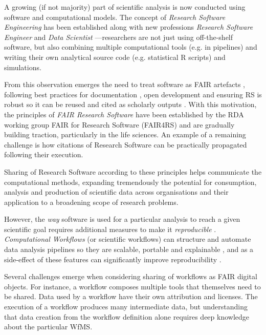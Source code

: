 A growing (if not majority) part of scientific analysis is now conducted using software and computational models.
The concept of \emph{Research Software Engineering} \cite{Cohen 2020} has been established along with new professions \emph{Research Software Engineer} \cite{Baxter 2012} and \emph{Data Scientist} \cite{van der Aalst 2014}---researchers are not just using off-the-shelf software, but also combining multiple computational tools (e.g. in pipelines) and writing their own analytical source code (e.g. statistical R scripts) and simulations.

From this observation emerges the need to treat software as FAIR artefacts \cite{Lamprecht 2019}, following best practices for documentation \cite{Lee 2018}, open development \cite{Prlić 2012} and ensuring \acrfull{RS} is robust \cite{Taschuk 2017} so it can be reused and cited as scholarly outputs \cite{Smith 2016}. 
With this motivation, the principles of \emph{FAIR Research Software} \cite{Katz 2021b} have been established by the \acrfull{RDA} working group FAIR for Research Software (FAIR4RS)  \cite{Barker 2022} and are gradually building traction, particularly in the life sciences.
An example of a remaining challenge is how citations of Research Software can be practically propagated following their execution. 

Sharing of Research Software according to these principles helps communicate the computational methods, expanding tremendously the potential for consumption, analysis and production of scientific data across organisations and their application to a broadening scope of research problems.

However, the \emph{way} software is used for a particular analysis to reach a given scientific goal requires additional measures to make it \emph{reproducible} \cite{Stodden 2016,Sandve 2013}. \emph{Computational Workflows} (or \glspl{scientific workflow}) can structure and automate data analysis pipelines so they are scalable, portable and explainable \cite{Atkinson 2017}, and as a side-effect of these features can significantly improve reproducibility \cite{Cohen-Boulakia 2017}. 

Several challenges emerge when considering sharing of workflows as FAIR digital objects. For instance, a workflow composes multiple tools that themselves need to be shared. Data used by a workflow have their own attribution and licenses. The execution of a workflow produces many intermediate data, but understanding that data creation from the workflow definition alone requires deep knowledge about the particular \acrfull{WfMS}.


